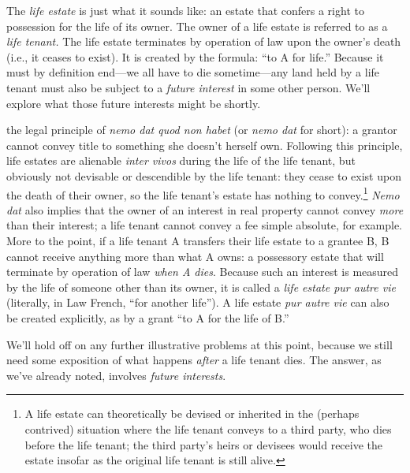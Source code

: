 The \textit{life estate} is just what it sounds like: an estate that confers a
right to possession for the life of its owner. The owner of a life estate is
referred to as a \textit{life tenant.} The life estate terminates by operation
of law upon the owner's death (i.e., it ceases to exist). It is created by the
formula: ``to A for life.'' Because it must by definition end---we all have to
die sometime---any land held by a life tenant must also be subject to a
\textit{future interest} in some other person. We'll explore what those future
interests might be shortly.

the legal principle of \textit{nemo dat quod non habet} (or \textit{nemo dat}
for short):
a grantor cannot convey title to something she doesn't herself own.
Following this principle, life estates are alienable \textit{inter vivos}
during the life of the life tenant, but obviously not devisable or
descendible by the life tenant: they cease to exist upon the death of their
owner, so the life
tenant's estate has nothing to convey.\footnote{A life estate can theoretically
be devised or inherited in the (perhaps contrived) situation where the life
tenant conveys to a third party, who dies before the life tenant; the third
party's heirs or devisees would receive the estate insofar as the original life
tenant is still alive.}
\textit{Nemo dat} also implies that the
owner of an interest in real property cannot convey \textit{more} than their
interest; a life tenant cannot convey a fee simple absolute, for example. More
to the point, if a life tenant A transfers their life estate to a grantee B, B
cannot receive anything more than what A owns: a possessory estate that will
terminate by operation of law \textit{when A dies}. Because such an interest is
measured by the life of someone other than its owner, it is called a
\textit{life estate pur autre vie} (literally, in Law French, ``for another
life''). A life estate \textit{pur autre vie} can also be created explicitly,
as by a grant ``to A for the life of B.''

We'll hold off on any further illustrative problems at this point, because we
still need some exposition of what happens \textit{after} a life tenant dies.
The answer, as we've already noted, involves \textit{future interests}.

